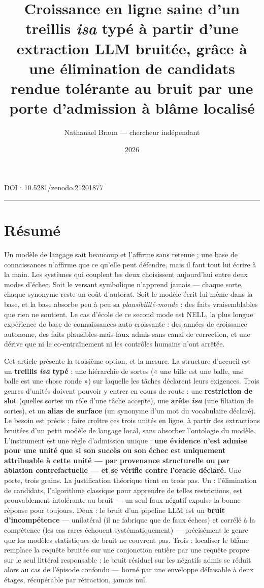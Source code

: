\documentclass[11pt]{article}
\title{\textbf{Croissance en ligne saine d'un treillis \emph{isa} typé à partir d'une extraction LLM bruitée, grâce à une élimination de candidats rendue tolérante au bruit par une porte d'admission à blâme localisé}}
\author{Nathanael Braun — chercheur indépendant}
\date{2026}
\begin{document}
\maketitle
DOI : 10.5281/zenodo.21201877

\medskip\hrule\medskip

\section*{Résumé}

Un modèle de langage sait beaucoup et l'affirme sans retenue ; une base de connaissances n'affirme que ce qu'elle peut défendre, mais il faut tout lui écrire à la main. Les systèmes qui couplent les deux choisissent aujourd'hui entre deux modes d'échec. Soit le versant symbolique n'apprend jamais — chaque sorte, chaque synonyme reste un coût d'autorat. Soit le modèle écrit lui-même dans la base, et la base absorbe peu à peu sa \emph{plausibilité-monde} : des faits vraisemblables que rien ne soutient. Le cas d'école de ce second mode est NELL, la plus longue expérience de base de connaissances auto-croissante : des années de croissance autonome, des faits plausibles-mais-faux admis sans canal de correction, et une dérive que ni le co-entraînement ni les contrôles humains n'ont arrêtée.

Cet article présente la troisième option, et la mesure. La structure d'accueil est un \textbf{treillis \emph{isa} typé} : une hiérarchie de sortes (« une bille est une balle, une balle est une chose ronde ») sur laquelle les tâches déclarent leurs exigences. Trois genres d'unités doivent pouvoir y entrer en cours de route : une \textbf{restriction de slot} (quelles sortes un rôle d'une tâche accepte), une \textbf{arête \emph{isa}} (une filiation de sortes), et un \textbf{alias de surface} (un synonyme d'un mot du vocabulaire déclaré). Le besoin est précis : faire croître ces trois unités en ligne, à partir des extractions bruitées d'un petit modèle de langage local, sans absorber l'ontologie du modèle. L'instrument est une règle d'admission unique : \textbf{une évidence n'est admise pour une unité que si son succès ou son échec est uniquement attribuable à cette unité — par provenance structurelle ou par ablation contrefactuelle — et se vérifie contre l'oracle déclaré.} Une porte, trois grains. La justification théorique tient en trois pas. Un : l'élimination de candidats, l'algorithme classique pour apprendre de telles restrictions, est prouvablement intolérante au bruit — un seul faux négatif expulse la bonne réponse pour toujours. Deux : le bruit d'un pipeline LLM est un \textbf{bruit d'incompétence} — unilatéral (il ne fabrique que de faux échecs) et corrélé à la compétence (les cas rares échouent systématiquement) — précisément le genre que les modèles statistiques de bruit ne couvrent pas. Trois : localiser le blâme remplace la requête bruitée sur une conjonction entière par une requête propre sur le seul littéral responsable ; le bruit résiduel sur les négatifs admis se réduit alors au cas de l'épisode confondu — borné par une enveloppe défaisable à deux étages, récupérable par rétraction, jamais nul.
\end{document}
